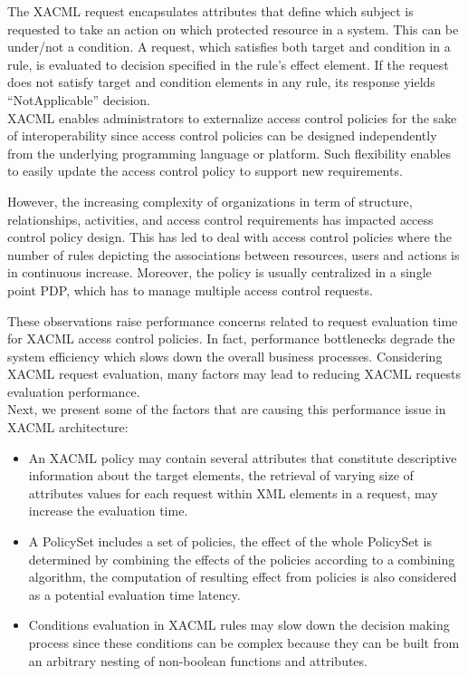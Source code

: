 The XACML request encapsulates attributes that define which subject is requested to take an action on which protected resource in a system.
This can be under/not a condition. A request, which satisfies both target and condition in a rule, is evaluated
to decision specified in the rule's effect element. If the request does not satisfy target and condition elements in any rule, its response yields ``NotApplicable'' decision.
\\XACML enables administrators to externalize access control policies for the sake of interoperability since access control policies can be designed 
independently from the underlying programming language or platform. Such flexibility enables to easily update the access control policy to support new requirements.

However, the increasing complexity of organizations in term of structure, relationships, activities, and access control requirements has impacted 
access control policy design. This has led to deal with access control policies where the number of rules depicting the associations between resources, 
users and actions is in continuous increase. Moreover, the policy is usually centralized in a single point PDP, which 
has to manage multiple access control requests.

These observations raise performance concerns related to request evaluation time for XACML access control policies. 
In fact, performance bottlenecks degrade the system efficiency which slows down the overall business processes. 
Considering XACML request evaluation, many factors may lead to reducing XACML requests evaluation performance.  
\\
Next, we present some of the factors that are causing this performance issue in XACML architecture:

\begin{itemize}
\item An XACML policy may contain several attributes that constitute descriptive information about the target elements, the retrieval of
 varying size of attributes values for each request within XML elements in a request, may increase the evaluation time.
\item A PolicySet includes a set of policies, the effect of the whole
PolicySet is determined by combining the effects of the policies according to a combining algorithm, the computation of resulting effect 
from policies is also considered as a potential evaluation time latency.
\item Conditions evaluation in XACML rules may slow down the decision making process since these conditions can be complex because they can 
be built from an arbitrary nesting of non-boolean functions and attributes. 
\end{itemize}

